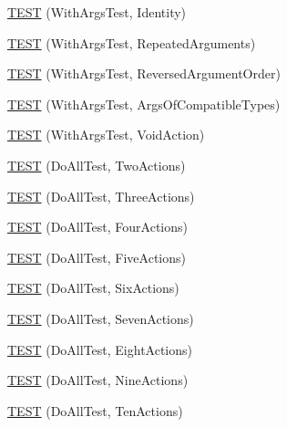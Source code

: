 \begin{DoxyCompactItemize}
\item 
\hyperlink{namespacetesting_1_1gmock__generated__actions__test_a0499d0970300d8d6c252a898222b8dd3}{T\+E\+ST} (With\+Args\+Test, Identity)
\item 
\hyperlink{namespacetesting_1_1gmock__generated__actions__test_aea7114a30b1fc589d14e84f1a27bd1fb}{T\+E\+ST} (With\+Args\+Test, Repeated\+Arguments)
\item 
\hyperlink{namespacetesting_1_1gmock__generated__actions__test_a8a9dc47b8e9810ca74166a9d17cba54f}{T\+E\+ST} (With\+Args\+Test, Reversed\+Argument\+Order)
\item 
\hyperlink{namespacetesting_1_1gmock__generated__actions__test_a4330224375c915f21860c30798dacd0c}{T\+E\+ST} (With\+Args\+Test, Args\+Of\+Compatible\+Types)
\item 
\hyperlink{namespacetesting_1_1gmock__generated__actions__test_a744fd048a745e3df48a578ed251003c6}{T\+E\+ST} (With\+Args\+Test, Void\+Action)
\item 
\hyperlink{namespacetesting_1_1gmock__generated__actions__test_ab1820fa999561582ae20885c4149a634}{T\+E\+ST} (Do\+All\+Test, Two\+Actions)
\item 
\hyperlink{namespacetesting_1_1gmock__generated__actions__test_a9fe00b82e3daa39501cefb4636b1909c}{T\+E\+ST} (Do\+All\+Test, Three\+Actions)
\item 
\hyperlink{namespacetesting_1_1gmock__generated__actions__test_aa6ed664752eab81abc0c8ec08bc28fe0}{T\+E\+ST} (Do\+All\+Test, Four\+Actions)
\item 
\hyperlink{namespacetesting_1_1gmock__generated__actions__test_adf15fb74ccf2a473a31f0ae733210f3f}{T\+E\+ST} (Do\+All\+Test, Five\+Actions)
\item 
\hyperlink{namespacetesting_1_1gmock__generated__actions__test_af9328f486c8862bfb3a08bd9c0b10a2d}{T\+E\+ST} (Do\+All\+Test, Six\+Actions)
\item 
\hyperlink{namespacetesting_1_1gmock__generated__actions__test_aa1eb8dae72fb173011bf64027f075cea}{T\+E\+ST} (Do\+All\+Test, Seven\+Actions)
\item 
\hyperlink{namespacetesting_1_1gmock__generated__actions__test_a7e7ffc936de010908f42193b951016e3}{T\+E\+ST} (Do\+All\+Test, Eight\+Actions)
\item 
\hyperlink{namespacetesting_1_1gmock__generated__actions__test_ae2037cf34f7bbdb2aa779f31f44c0530}{T\+E\+ST} (Do\+All\+Test, Nine\+Actions)
\item 
\hyperlink{namespacetesting_1_1gmock__generated__actions__test_a11cc35bfa98278915c040aac2329b4a7}{T\+E\+ST} (Do\+All\+Test, Ten\+Actions)

\end{DoxyCompactItemize}
